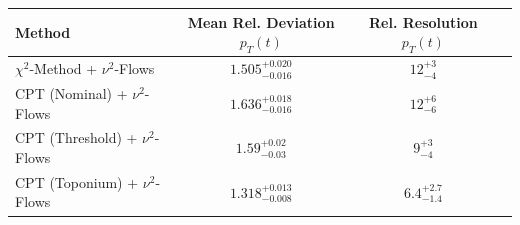     \begin{tabular}{lccc}
        \toprule
        Method & Mean Rel. Deviation $p_{T}(t)$ & Rel. Resolution $p_{T}(t)$ \\
        \midrule
        $\chi^2$-Method + $\nu^2$-Flows & $1.505^{+0.020}_{-0.016}$ & $12^{+3}_{-4}$ \\
        CPT (Nominal) + $\nu^2$-Flows & $1.636^{+0.018}_{-0.016}$ & $12^{+6}_{-6}$ \\
        CPT (Threshold) + $\nu^2$-Flows & $1.59^{+0.02}_{-0.03}$ & $9^{+3}_{-4}$ \\
        CPT (Toponium) + $\nu^2$-Flows & $1.318^{+0.013}_{-0.008}$ & $6.4^{+2.7}_{-1.4}$ \\
        \bottomrule
    \end{tabular}
